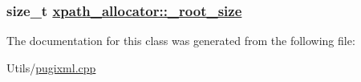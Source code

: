 \hypertarget{classxpath__allocator_dc703a6c3f3a0435f8b5f2e6c770b3fe}{
\subsubsection[\_\-root\_\-size]{\setlength{\rightskip}{0pt plus 5cm}size\_\-t \hyperlink{classxpath__allocator_dc703a6c3f3a0435f8b5f2e6c770b3fe}{xpath\_\-allocator::\_\-root\_\-size}}}
\label{classxpath__allocator_dc703a6c3f3a0435f8b5f2e6c770b3fe}




The documentation for this class was generated from the following file:\begin{CompactItemize}
\item 
Utils/\hyperlink{pugixml_8cpp}{pugixml.cpp}\end{CompactItemize}
